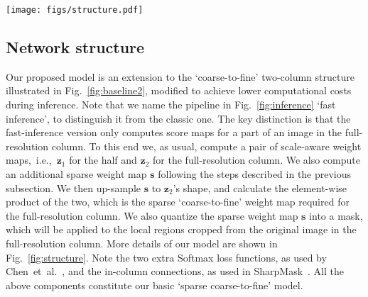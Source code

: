 \documentclass[10pt,twocolumn,letterpaper]{article}
\begin{document}
%
%
%
%
%
%
%
%
%
%
%
%
%
%
%
%
%
%
%
%
%
%
%


\begin{figure*}[t]
\begin{center}
\texttt{[image: figs/structure.pdf]}
\end{center}
\caption{
The structure of our model.
The configurations of layers are given as texts above the corresponding arrows.
For example, `Conv.: 3, 128, 3, 8' indicates a convolution layer having 128 kernels in the shape of 3$\times$3,
which are applied with a dilation rate of three and divided into eight groups~\cite{AlexNet.NIPS.2012.Krizhevsky}.
%
Blue dotted rectangles are feature maps of the cropped inputs;
red dash-dot arrows and rectangles denote the routes only enabled during training;
and back-propagation gradients never go through green dashed paths.
Best viewed in colour.
}
\label{fig:structure}
\vspace{-3.0mm}
\end{figure*}

\subsection{Network structure}\label{subsec:structure}
Our proposed model is an extension to the `coarse-to-fine' two-column structure illustrated in Fig.~\ref{fig:baseline2}, modified to achieve lower computational costs during inference.
Note that we name the pipeline in Fig.~\ref{fig:inference} `fast inference',
to distinguish it from the classic one.
The key distinction is that the fast-inference version only computes score maps for a part of an image in the full-resolution column.
To this end we, as usual, compute a pair of scale-aware weight maps,~i.e.,~$\boldsymbol{z}_1$ for the half and $\boldsymbol{z}_2$ for the full-resolution column.
We also compute an additional sparse weight map $\boldsymbol{s}$ following the steps described in the previous subsection.
We then up-sample $\boldsymbol{s}$ to $\boldsymbol{z}_2$'s shape,
and calculate the element-wise product of the two,
which is the sparse `coarse-to-fine' weight map required for the full-resolution column.
We also quantize the sparse weight map $\boldsymbol{s}$ into a mask,
which will be applied to the local regions cropped from the original image in the full-resolution column.
More details of our model are shown in Fig.~\ref{fig:structure}.
Note the two extra Softmax loss functions, as used by Chen~et~al.~\cite{Attention2Scale.2015.Chen},
and the in-column connections, as used in SharpMask~\cite{SharpMask.2016.Pinheiro}.
All the above components constitute our basic `sparse coarse-to-fine' model.
\end{document}
